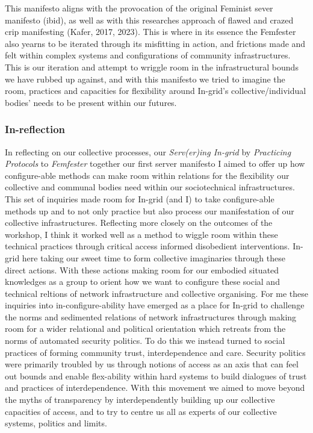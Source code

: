 This manifesto aligns with the provocation of the original Feminist
sever manifesto (ibid), as well as with this researches approach of
flawed and crazed crip manifesting (Kafer, 2017, 2023). This is where in
its essence the Femfester also yearns to be iterated through its
misfitting in action, and frictions made and felt within complex systems
and configurations of community infrastructures. This is our iteration
and attempt to wriggle room in the infrastructural bounds we have rubbed
up against, and with this manifesto we tried to imagine the room,
practices and capacities for flexibility around In-grid's
collective/individual bodies' needs to be present within our futures.

\hypertarget{in-reflection}{%
\subsubsection{In-reflection}\label{in-reflection}}

In reflecting on our collective processes, our \emph{Serv(er)ing
In-grid} by \emph{Practicing Protocols} to \emph{Femfester} together our
first server manifesto I aimed to offer up how configure-able methods
can make room within relations for the flexibility our collective and
communal bodies need within our sociotechnical infrastructures. This set
of inquiries made room for In-grid (and I) to take configure-able
methods up and to not only practice but also process our manifestation
of our collective infrastructures. Reflecting more closely on the
outcomes of the workshop, I think it worked well as a method to wiggle
room within these technical practices through critical access informed
disobedient interventions. In-grid here taking our sweet time to form
collective imaginaries through these direct actions. With these actions
making room for our embodied situated knowledges as a group to orient
how we want to configure these social and technical reltions of network
infrastructure and collective organising. For me these inquiries into
in-configure-ability have emerged as a place for In-grid to challenge
the norms and sedimented relations of network infrastructures through
making room for a wider relational and political orientation which
retreats from the norms of automated security politics. To do this we
instead turned to social practices of forming community trust,
interdependence and care. Security politics were primarily troubled by
us through notions of access as an axis that can feel out bounds and
enable flex-ability within hard systems to build dialogues of trust and
practices of interdependence. With this movement we aimed to move beyond
the myths of transparency by interdependently building up our collective
capacities of access, and to try to centre us all as experts of our
collective systems, politics and limits.

